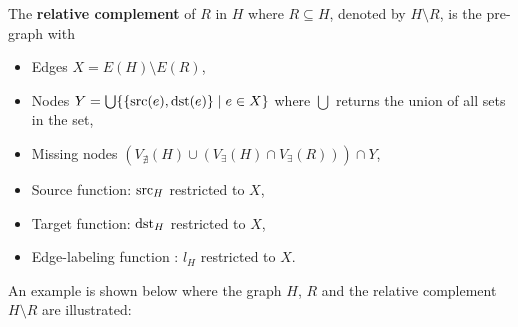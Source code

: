 The \textbf{relative complement} of $R$ in $H$ where $R \subseteq H$, denoted by $H \setminus R$, is the pre-graph with
\begin{itemize}
    \item Edges $X = E(H) \setminus E(R)$,
    \item Nodes $Y =  \bigcup \{\{\operatorname{src}(e), \operatorname{dst}(e)\} \mid e \in X \}$ where $\bigcup$ returns the union of all sets in the set,  
    \item Missing nodes $
   ( V_{\nexists}(H)  \cup
        (
                  V_\exists(H) 
                  \cap 
                  V_\exists(R)
                  )
   )
        \cap  
        Y
                  $,
    \item Source function: ${\operatorname{src}_H}$ restricted to $X$,
    \item Target function: ${\operatorname{dst}_H}$ restricted to $X$,
    \item Edge-labeling function : $l_H$ restricted to $X$.
\end{itemize}
An example is shown below where the graph $H$, $R$ and the relative complement $H \setminus R$ are illustrated:
